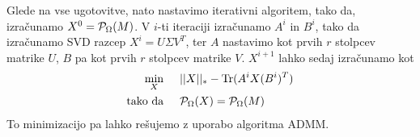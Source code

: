 Glede na vse ugotovitve, nato nastavimo iterativni algoritem, tako da, izračunamo $X^0 = \mathcal{P}_\Omega(M)$. V $i$-ti iteraciji izračunamo $A^i$ in $B^i$, tako da izračunamo SVD razcep $X^i = U \Sigma V^T$, ter $A$ nastavimo kot prvih $r$ stolpcev matrike $U$, $B$ pa kot prvih $r$ stolpcev matrike $V$. $X^{i+1}$ lahko sedaj izračunamo kot \cite{HZYLH12}
\begin{align*}
    \min_X \hspace{0.5cm} &||X||_* - \text{Tr}(A^iX(B^i)^T)\\
    \text{tako da} \hspace{0.5cm} &\mathcal{P}_\Omega(X) = \mathcal{P}_\Omega(M)
\end{align*}
To minimizacijo pa lahko rešujemo z uporabo algoritma ADMM.
